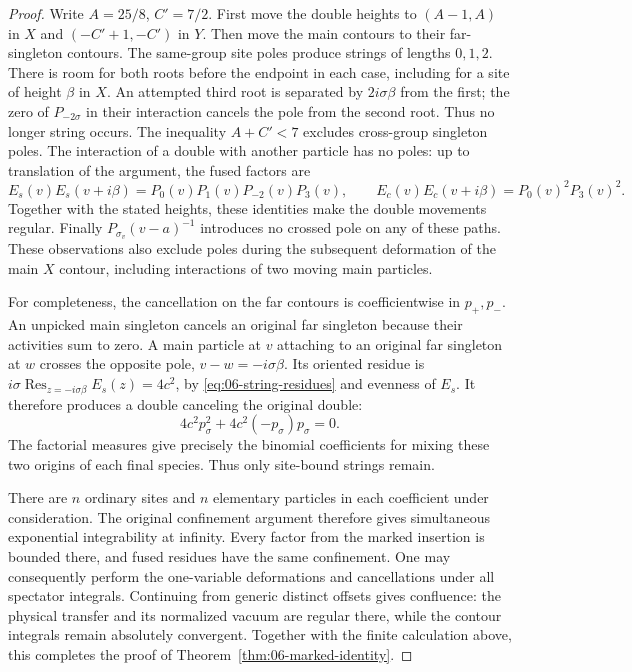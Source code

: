 \begin{proof}
Write \(A=25/8\), \(C'=7/2\).  First move the double heights to
\((A-1,A)\) in \(X\) and \((-C'+1,-C')\) in \(Y\).
Then move the main contours to their far-singleton contours.
The same-group site poles produce strings of lengths \(0,1,2\).
There is room for both roots before the endpoint in each case,
including for a site of height \(\beta\) in \(X\).
An attempted third root is separated by \(2i\sigma\beta\) from
the first; the zero of \(P_{-2\sigma}\) in their interaction cancels
the pole from the second root. Thus no longer string occurs.
The inequality \(A+C'<7\) excludes cross-group singleton poles.
The interaction of a double with another particle has no poles:
up to translation of the argument, the fused factors are
\[
 E_s(v)E_s(v+i\beta)=P_0(v)P_1(v)P_{-2}(v)P_3(v),
 \qquad
 E_c(v)E_c(v+i\beta)=P_0(v)^2P_3(v)^2.
\]
Together with the stated heights, these identities make the double
movements regular. Finally
\(P_{\sigma_v}(v-a)^{-1}\) introduces no crossed pole on any of these
paths.  These observations also exclude poles during the subsequent
deformation of the main \(X\) contour, including interactions of two
moving main particles.

For completeness, the cancellation on the far contours is
coefficientwise in \(p_+,p_-\).  An unpicked main singleton cancels
an original far singleton because their activities sum to zero.
A main particle at \(v\) attaching to an original far singleton at
\(w\) crosses the opposite pole, \(v-w=-i\sigma\beta\).
Its oriented residue is
\(i\sigma\operatorname*{Res}_{z=-i\sigma\beta}E_s(z)=4c^2\),
by \eqref{eq:06-string-residues} and evenness of \(E_s\).
It therefore produces a double canceling the original double:
\[
 4c^2p_\sigma^2+4c^2(-p_\sigma)p_\sigma=0.
\]
The factorial measures give precisely the binomial coefficients
for mixing these two origins of each final species.  Thus only
site-bound strings remain.

There are \(n\) ordinary sites and \(n\) elementary particles in each
coefficient under consideration.  The original confinement argument
therefore gives simultaneous exponential integrability at infinity.
Every factor from the marked insertion is bounded there, and fused
residues have the same confinement.  One may consequently perform
the one-variable deformations and cancellations under all spectator
integrals.  Continuing from generic distinct offsets gives
confluence: the physical transfer and its normalized vacuum are
regular there, while the contour integrals remain absolutely
convergent. Together with the finite calculation above, this completes
the proof of Theorem~\ref{thm:06-marked-identity}.
\end{proof}
